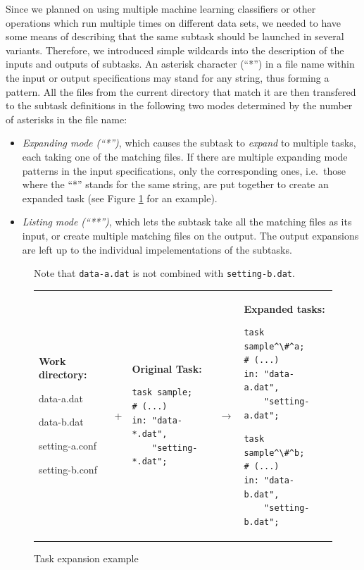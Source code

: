 \documentclass[12pt,notitlepage]{report}
\begin{document}
Since we planned on using multiple machine learning classifiers or other operations which run multiple times on different data sets, we needed to have some means of describing that the same subtask should be launched in several variants. Therefore, we introduced simple wildcards into the description of the inputs and outputs of subtasks. An asterisk character (``*'') in a file name within the input or output specifications may stand for any string, thus forming a pattern. All the files from the current directory that match it are then transfered to the subtask definitions in the following two modes determined by the number of asterisks in the file name:
\begin{itemize}
    \item \emph{Expanding mode (``*'')}, which causes the subtask to \emph{expand} to multiple tasks, each taking one of the matching files. If there are multiple expanding mode patterns in the input specifications, only the corresponding ones, i.e.\ those where the ``*'' stands for the same string, are put together to create an expanded task (see Figure \ref{fig:expansion} for an example).
    \item \emph{Listing mode (``**'')}, which lets the subtask take all the matching files as its input, or create multiple matching files on the output. The output expansions are left up to the individual impelementations of the subtasks.
\end{itemize}

\begin{figure}
\caption{Task expansion example}\label{fig:expansion}\footnotesize
\begin{center}
Note that \texttt{data-a.dat} is not combined with \texttt{setting-b.dat}.

\begin{tabular}{m{3cm} c m{4.1cm} c m{4.1cm}}
\textbf{Work directory:}\par data-a.dat \par data-b.dat \par setting-a.conf \par setting-b.conf &
+ & 
\textbf{Original Task:} \par \begin{lstlisting}
task sample;
# (...)
in: "data-*.dat", 
    "setting-*.dat";\end{lstlisting} &
$\rightarrow$ &
\textbf{Expanded tasks:} \par \begin{lstlisting}
task sample^\#^a;
# (...)
in: "data-a.dat", 
    "setting-a.dat";\end{lstlisting} \par \begin{lstlisting}
task sample^\#^b;
# (...)
in: "data-b.dat", 
    "setting-b.dat";\end{lstlisting}
\end{tabular}
\end{center}
\end{figure}
\end{document}
